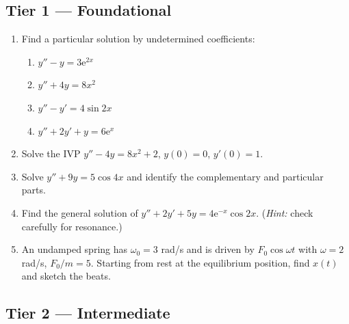 \documentclass[12pt,a4paper]{article}
\newcommand{\ee}{\mathrm{e}}
\begin{document}
\subsection*{Tier 1 --- Foundational}

\begin{enumerate}[label=\textbf{\arabic*.}, leftmargin=*]

\item Find a particular solution by undetermined coefficients:
  \begin{enumerate}[label=(\alph*)]
    \item $y'' - y = 3\ee^{2x}$
    \item $y'' + 4y = 8x^2$
    \item $y'' - y' = 4\sin 2x$
    \item $y'' + 2y' + y = 6\ee^{x}$
  \end{enumerate}

\item Solve the IVP $y'' - 4y = 8x^2 + 2$, $y(0)=0$, $y'(0)=1$.

\item Solve $y'' + 9y = 5\cos 4x$ and identify the complementary and particular parts.

\item Find the general solution of $y'' + 2y' + 5y = 4\ee^{-x}\cos 2x$.
  (\textit{Hint:} check carefully for resonance.)

\item An undamped spring has $\omega_0 = 3$ rad/s and is driven by $F_0\cos\omega t$
  with $\omega = 2$ rad/s, $F_0/m = 5$. Starting from rest at the equilibrium position,
  find $x(t)$ and sketch the beats.

\end{enumerate}

\subsection*{Tier 2 --- Intermediate}
\end{document}
